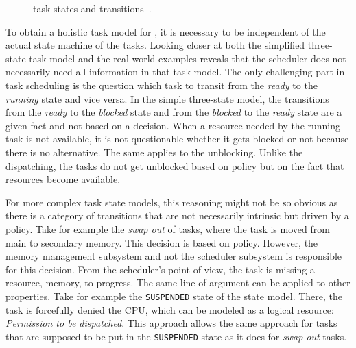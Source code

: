 \begin{figure}[t!]\centering
	\caption[\uitron{} task states and transitions]{\uitron{} task states and transitions~\cite[54]{uITRON}.}%
	\label{fig:intro:uitron}
\end{figure}

To obtain a holistic task model for \cobas{}, it is necessary to be independent of the actual state machine of the tasks. Looking closer at both the simplified three-state task model and the real-world examples reveals that the scheduler does not necessarily need all information in that task model. The only challenging part in task scheduling is the question which task to transit from the \emph{ready} to the \emph{running} state and vice versa. In the simple three-state model, the transitions from the \emph{ready} to the \emph{blocked} state and from the \emph{blocked} to the \emph{ready} state are a given fact and not based on a decision. When a resource needed by the running task is not available, it is not questionable whether it gets blocked or not because there is no alternative. The same applies to the unblocking. Unlike the dispatching, the tasks do not get unblocked based on policy but on the fact that resources become available.

For more complex task state models, this reasoning might not be so obvious as there is a category of transitions that are not necessarily intrinsic but driven by a policy. Take for example the \emph{swap out} of tasks, where the task is moved from main to secondary memory. This decision is based on policy. However, the memory management subsystem and not the scheduler subsystem is responsible for this decision. From the scheduler's point of view, the task is missing a resource, \ie{} memory, to progress. The same line of argument can be applied to other properties. Take for example the \texttt{SUSPENDED} state of the \uitron{} state model. There, the task is forcefully denied the CPU, which can be modeled as a logical resource: \emph{Permission to be dispatched}. This approach allows the same approach for tasks that are supposed to be put in the \texttt{SUSPENDED} state as it does for \emph{swap out} tasks.


